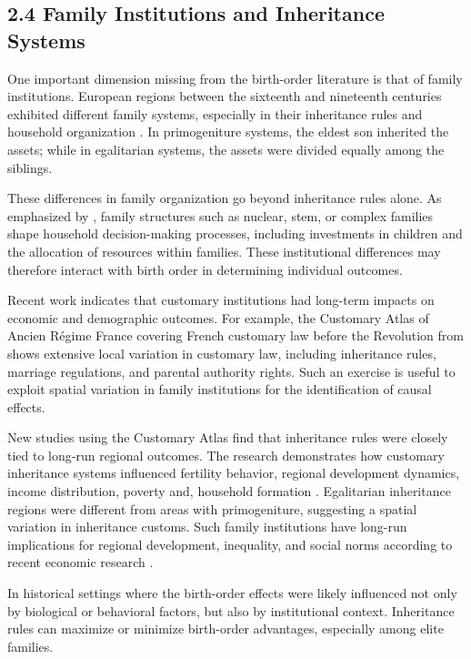 \subsection*{2.4 Family Institutions and Inheritance Systems}

One important dimension missing from the birth-order literature is that of family institutions. European regions between the sixteenth and nineteenth centuries exhibited different family systems, especially in their inheritance rules and household organization \cite{Todd1990}. In primogeniture systems, the eldest son inherited the assets; while in egalitarian systems, the assets were divided equally among the siblings.

These differences in family organization go beyond inheritance rules alone. As emphasized by \cite{BaudinDeRockGobbi2023}, family structures such as nuclear, stem, or complex families shape household decision-making processes, including investments in children and the allocation of resources within families. These institutional differences may therefore interact with birth order in determining individual outcomes.

Recent work indicates that customary institutions had long-term impacts on economic and demographic outcomes. For example, the Customary Atlas of Ancien Régime France covering French customary law before the Revolution from \cite{Gobbi2024} shows extensive local variation in customary law, including inheritance rules, marriage regulations, and parental authority rights. Such an exercise is useful to exploit spatial variation in family institutions for the identification of causal effects.

New studies using the Customary Atlas find that inheritance rules were closely tied to long‑run regional outcomes. The research demonstrates how customary inheritance systems influenced fertility behavior, regional development dynamics, income distribution, poverty and, household formation \citep{Gobbi2025}. Egalitarian inheritance regions were different from areas with primogeniture, suggesting a spatial variation in inheritance customs. Such family institutions have long-run implications for regional development, inequality, and social norms according to recent economic research \citep{Duranton2008, Gobbi2025}. 

In historical settings where the birth-order effects were likely influenced not only by biological or behavioral factors, but also by institutional context. Inheritance rules can maximize or minimize birth-order advantages, especially among elite families.

